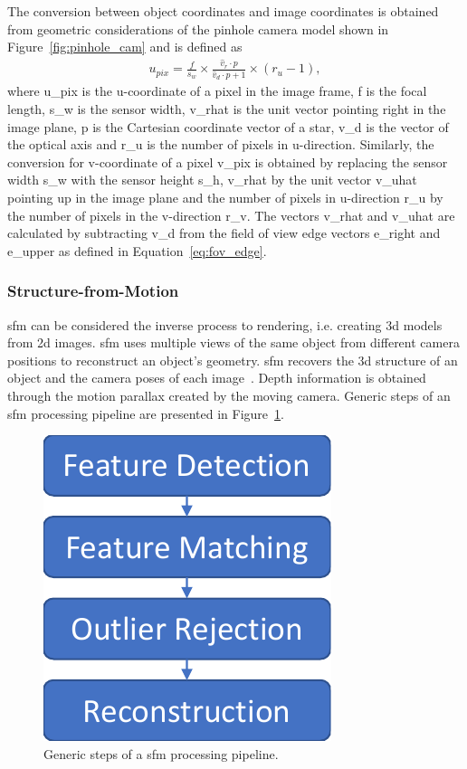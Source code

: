 The conversion between object coordinates and image coordinates is obtained from geometric considerations of the pinhole camera model shown in Figure~\ref{fig:pinhole_cam} and is defined as
\begin{align}
    u_{pix} = \frac{f}{s_w} \times \frac{\hat{v}_r \cdot p}{\hat{v}_d \cdot p + 1} \times (r_u - 1), \label{eq:pix_conversion} 
\end{align}
where \gls{u_pix} is the u-coordinate of a pixel in the image frame, \gls{f} is the focal length, \gls{s_w} is the sensor width, \gls{v_rhat} is the unit vector pointing right in the image plane, \gls{p} is the Cartesian coordinate vector of a star, \gls{v_d} is the vector of the optical axis and \gls{r_u} is the number of pixels in u-direction. Similarly, the conversion for v-coordinate of a pixel \gls{v_pix} is obtained by replacing the sensor width \gls{s_w} with the sensor height \gls{s_h}, \gls{v_rhat} by the unit vector \gls{v_uhat} pointing up in the image plane and the number of pixels in u-direction \gls{r_u} by the number of pixels in the v-direction \gls{r_v}. The vectors \gls{v_rhat} and \gls{v_uhat} are calculated by subtracting \gls{v_d} from the field of view edge vectors \gls{e_right} and \gls{e_upper} as defined in Equation~\ref{eq:fov_edge}.

\subsubsection{Structure-from-Motion}
\Gls{sfm} can be considered the inverse process to rendering, i.e. creating \gls{3d} models from \gls{2d} images. \Gls{sfm} uses multiple views of the same object from different camera positions to reconstruct an object's geometry. \Gls{sfm} recovers the \gls{3d} structure of an object and the camera poses of each image~\cite{szeliski2010computer}. Depth information is obtained through the motion parallax created by the moving camera. Generic steps of an \gls{sfm} processing pipeline are presented in Figure~\ref{fig:sfm_steps}.

\begin{figure}[htb]
    \centering
    \includegraphics[width=.25\textwidth]{doc/thesis/0_figures/sfm/SfM.pdf}
    \caption{Generic steps of a \gls{sfm} processing pipeline.}
    \label{fig:sfm_steps}
\end{figure}

